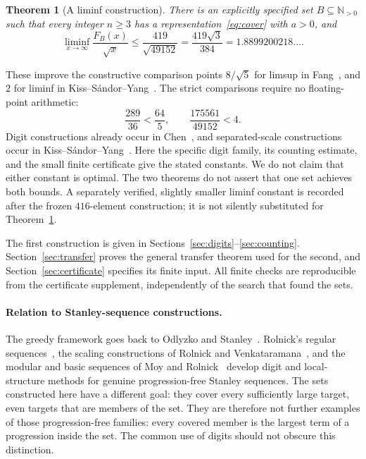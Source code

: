\documentclass[11pt]{article}
\newtheorem{theorem}{Theorem}[section]
\theoremstyle{definition}\newtheorem{definition}[theorem]{Definition}
\theoremstyle{remark}\newtheorem{remark}[theorem]{Remark}
\numberwithin{equation}{section}
\newcommand{\Np}{\mathbb N_{>0}}
\begin{document}
\begin{theorem}[A liminf construction]\label{thm:inf}
There is an explicitly specified set $B\subseteq\Np$ such that every integer $n\ge3$ has a representation~\eqref{eq:cover} with $a>0$, and
\begin{equation}\label{eq:inf}
\liminf_{x\to\infty}\frac{F_B(x)}{\sqrt{x}}
\le\frac{419}{\sqrt{49152}}
=\frac{419\sqrt3}{384}=1.8899200218\ldots.
\end{equation}
\end{theorem}

These improve the constructive comparison points $8/\sqrt5$ for limsup in Fang~\cite{Fang}, and $2$ for liminf in Kiss--S\'andor--Yang~\cite[Theorem 1]{KSY}. The strict comparisons require no floating-point arithmetic:
\[
\frac{289}{36}<\frac{64}{5},\qquad
\frac{175561}{49152}<4.
\]
Digit constructions already occur in Chen~\cite{Chen}, and separated-scale constructions occur in Kiss--S\'andor--Yang~\cite{KSY}. Here the specific digit family, its counting estimate, and the small finite certificate give the stated constants. We do not claim that either constant is optimal. The two theorems do not assert that one set achieves both bounds. A separately verified, slightly smaller liminf constant is recorded after the frozen $416$-element construction; it is not silently substituted for Theorem~\ref{thm:inf}.

The first construction is given in Sections~\ref{sec:digits}--\ref{sec:counting}. Section~\ref{sec:transfer} proves the general transfer theorem used for the second, and Section~\ref{sec:certificate} specifies its finite input. All finite checks are reproducible from the certificate supplement, independently of the search that found the sets.

\paragraph{Relation to Stanley-sequence constructions.}
The greedy framework goes back to Odlyzko and Stanley~\cite{OS}.
Rolnick's regular sequences~\cite{Rol}, the scaling constructions of Rolnick
and Venkataramana~\cite{RV}, and the modular and basic sequences of Moy and
Rolnick~\cite{MR} develop digit and local-structure methods for genuine
progression-free Stanley sequences. The sets constructed here have a different
goal: they cover every sufficiently large target, even targets that are members
of the set. They are therefore not further examples of those progression-free
families: every covered member is the largest term of a progression inside the
set. The common use of digits should not obscure this distinction.
\end{document}
